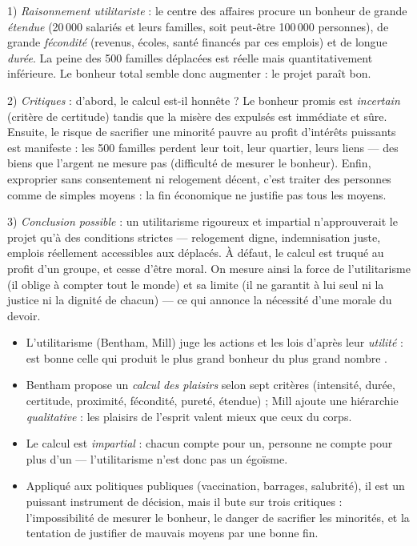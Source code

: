 \documentclass[11pt]{article}
\begin{document}
\begin{corrige}[Exercice]
1) \emph{Raisonnement utilitariste} : le centre des affaires procure un bonheur de grande \emph{étendue} (20\,000 salariés et leurs familles, soit peut-être 100\,000 personnes), de grande \emph{fécondité} (revenus, écoles, santé financés par ces emplois) et de longue \emph{durée}. La peine des 500 familles déplacées est réelle mais quantitativement inférieure. Le bonheur total semble donc augmenter : le projet paraît bon.

2) \emph{Critiques} : d'abord, le calcul est-il honnête ? Le bonheur promis est \emph{incertain} (critère de certitude) tandis que la misère des expulsés est immédiate et sûre. Ensuite, le risque de sacrifier une minorité pauvre au profit d'intérêts puissants est manifeste : les 500 familles perdent leur toit, leur quartier, leurs liens — des biens que l'argent ne mesure pas (difficulté de mesurer le bonheur). Enfin, exproprier sans consentement ni relogement décent, c'est traiter des personnes comme de simples moyens : la fin économique ne justifie pas tous les moyens.

3) \emph{Conclusion possible} : un utilitarisme rigoureux et impartial n'approuverait le projet qu'à des conditions strictes — relogement digne, indemnisation juste, emplois réellement accessibles aux déplacés. À défaut, le calcul est truqué au profit d'un groupe, et cesse d'être moral. On mesure ainsi la force de l'utilitarisme (il oblige à compter tout le monde) et sa limite (il ne garantit à lui seul ni la justice ni la dignité de chacun) — ce qui annonce la nécessité d'une morale du devoir.
\end{corrige}

\begin{aretenir}
\begin{itemize}
\item L'utilitarisme (Bentham, Mill) juge les actions et les lois d'après leur \emph{utilité} : est bonne celle qui produit \og le plus grand bonheur du plus grand nombre \fg{}.
\item Bentham propose un \emph{calcul des plaisirs} selon sept critères (intensité, durée, certitude, proximité, fécondité, pureté, étendue) ; Mill ajoute une hiérarchie \emph{qualitative} : les plaisirs de l'esprit valent mieux que ceux du corps.
\item Le calcul est \emph{impartial} : chacun compte pour un, personne ne compte pour plus d'un — l'utilitarisme n'est donc pas un égoïsme.
\item Appliqué aux politiques publiques (vaccination, barrages, salubrité), il est un puissant instrument de décision, mais il bute sur trois critiques : l'impossibilité de mesurer le bonheur, le danger de sacrifier les minorités, et la tentation de justifier de mauvais moyens par une bonne fin.
\end{itemize}
\end{aretenir}
\end{document}
